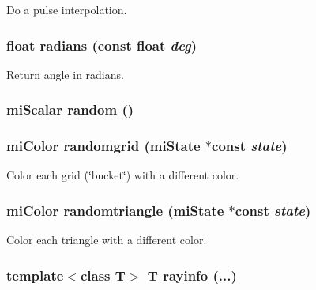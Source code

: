 Do a pulse interpolation. 

\subsubsection{\setlength{\rightskip}{0pt plus 5cm}float radians (const float {\em deg})\hspace{0.3cm}{\tt  [inline]}}\label{namespacersl_a24}


Return angle in radians. 

\subsubsection{\setlength{\rightskip}{0pt plus 5cm}mi\-Scalar random ()\hspace{0.3cm}{\tt  [inline]}}\label{namespacersl_a42}


\subsubsection{\setlength{\rightskip}{0pt plus 5cm}mi\-Color randomgrid (mi\-State $\ast$const {\em state})\hspace{0.3cm}{\tt  [inline]}}\label{namespacersl_a19}


Color each grid (\char`\"{}bucket\char`\"{}) with a different color. 

\subsubsection{\setlength{\rightskip}{0pt plus 5cm}mi\-Color randomtriangle (mi\-State $\ast$const {\em state})\hspace{0.3cm}{\tt  [inline]}}\label{namespacersl_a18}


Color each triangle with a different color. 

\subsubsection{\setlength{\rightskip}{0pt plus 5cm}template$<$class T$>$ T rayinfo (...)\hspace{0.3cm}{\tt  [inline]}}\label{namespacersl_a158}


